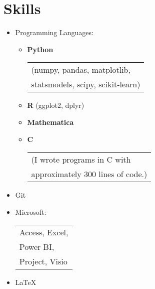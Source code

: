 \documentclass[12pt]{article}
\newcommand{\thesectionicon}{}
\newcommand{\sectionicon}[1]{\renewcommand{\thesectionicon}{#1}}
\begin{document}

\sectionicon{\faTools}
\section{Skills}

\begin{minipage}[t]{0.6\textwidth}
\begin{itemize}
  \setlength{\itemsep}{0pt}
  \item Programming Languages:
  \begin{itemize}
    \setlength{\itemsep}{0pt}
  \item \textbf{Python}
      \begin{tabular}[t]{l}
          (numpy, pandas, matplotlib, \\
           statsmodels, scipy, scikit-learn)\\
    \end{tabular}
    \item \textbf{R} (ggplot2, dplyr)
    \item \textbf{Mathematica}
    \item \textbf{C}
      \begin{tabular}[t]{l}
          (I wrote programs in C with\\
          approximately 300 lines of code.)\\
    \end{tabular}
  \end{itemize}
\end{itemize}
\end{minipage}
\begin{minipage}[t]{0.35\textwidth}
\begin{itemize}
  \setlength{\itemsep}{0pt}
  \item Git
  \item Microsoft:\\
    \begin{tabular}[t]{l}
      Access, Excel, \\
      Power BI,\\
      Project, Visio \\
    \end{tabular}
  \item \LaTeX
\end{itemize}
\hfill
\end{minipage}
\end{document}
